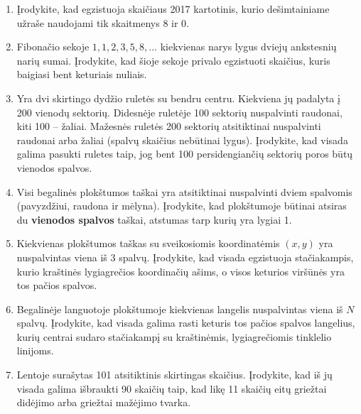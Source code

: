 \documentclass[11pt,a4paper]{scrartcl}
\begin{document}
\begin{enumerate}
    \item Įrodykite, kad egzistuoja skaičiaus 2017 kartotinis, kurio dešimtainiame užraše naudojami tik skaitmenys 8 ir 0.
    \item Fibonačio sekoje $1, 1, 2, 3, 5, 8, \dots$ kiekvienas narys lygus dviejų ankstesnių narių sumai. Įrodykite, kad šioje sekoje privalo egzistuoti skaičius, kuris baigiasi bent keturiais nuliais.
    \item Yra dvi skirtingo dydžio ruletės su bendru centru. Kiekviena jų padalyta į 200 vienodų sektorių. Didesnėje ruletėje 100 sektorių nuspalvinti raudonai, kiti 100 – žaliai. Mažesnės ruletės 200 sektorių atsitiktinai nuspalvinti raudonai arba žaliai (spalvų skaičius nebūtinai lygus). Įrodykite, kad visada galima pasukti ruletes taip, jog bent 100 persidengiančių sektorių poros būtų vienodos spalvos.
    \item Visi begalinės plokštumos taškai yra atsitiktinai nuspalvinti dviem spalvomis (pavyzdžiui, raudona ir mėlyna). Įrodykite, kad plokštumoje būtinai atsiras du \textbf{vienodos spalvos} taškai, atstumas tarp kurių yra lygiai 1.
    \item Kiekvienas plokštumos taškas su sveikosiomis koordinatėmis $(x, y)$ yra nuspalvintas viena iš 3 spalvų. Įrodykite, kad visada egzistuoja stačiakampis, kurio kraštinės lygiagrečios koordinačių ašims, o visos keturios viršūnės yra tos pačios spalvos.
    \item Begalinėje languotoje plokštumoje kiekvienas langelis nuspalvintas viena iš $N$ spalvų. Įrodykite, kad visada galima rasti keturis tos pačios spalvos langelius, kurių centrai sudaro stačiakampį su kraštinėmis, lygiagrečiomis tinklelio linijoms.
    \item Lentoje surašytas 101 atsitiktinis skirtingas skaičius. Įrodykite, kad iš jų visada galima išbraukti 90 skaičių taip, kad likę 11 skaičių eitų griežtai didėjimo arba griežtai mažėjimo tvarka.
\end{enumerate}
\end{document}
